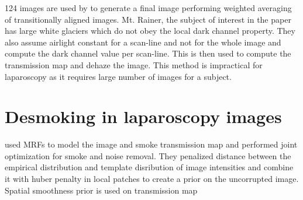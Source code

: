 124 images are used by \cite{joshi2010multi} to generate a final image performing weighted averaging of transitionally aligned images. Mt. Rainer, the subject of interest in the paper has large white glaciers which do not obey the local dark channel property. They also assume airlight constant for a scan-line and not for the whole image and compute the dark channel value per scan-line. This is then used to compute the transmission map and dehaze the image. This method is impractical for laparoscopy as it requires large number of images for a subject. 




\section{Desmoking in laparoscopy images}
\cite{kotwal2016joint} used MRFs to model the image and smoke transmission map and performed joint optimization for smoke and noise removal. They penalized distance between the empirical distribution and template disribution of image intensities and combine it with huber penalty in local patches to create a prior on the uncorrupted image. Spatial smoothness prior is used on transmission map












